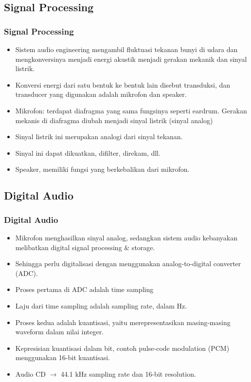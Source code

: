 \documentclass[pdflatex,compress]{beamer}
\begin{document}
\subsection{Signal Processing}

\begin{frame}
	\frametitle{Signal Processing}
	\begin{itemize}
		\item Sistem audio engineering mengambil fluktuasi tekanan bunyi di udara dan mengkonversinya menjadi energi akustik menjadi gerakan mekanik dan sinyal listrik.
		\item Konversi energi dari satu bentuk ke bentuk lain disebut transduksi, dan transducer yang digunakan adalah mikrofon dan speaker.
		\item Mikrofon: terdapat diafragma yang sama fungsinya seperti eardrum. Gerakan mekanis di diafragma diubah menjadi sinyal listrik (sinyal analog)
		\item Sinyal listrik ini merupakan analogi dari sinyal tekanan.
		\item Sinyal ini dapat dikuatkan, difilter, direkam, dll.
		\item Speaker, memiliki fungsi yang berkebalikan dari mikrofon.
	\end{itemize}
\end{frame}

\subsection{Digital Audio}

\begin{frame}
	\frametitle{Digital Audio}
	\begin{itemize}
		\item Mikrofon menghasilkan sinyal analog, sedangkan sistem audio kebanyakan melibatkan digital signal processing \& storage.
		\item Sehingga perlu digitalisasi dengan menggunakan analog-to-digital converter (ADC).
		\item Proses pertama di ADC adalah time sampling
		\item Laju dari time sampling adalah sampling rate, dalam Hz.
		\item Proses kedua adalah kuantisasi, yaitu merepresentasikan masing-masing waveform dalam nilai integer.
		\item Kepresisian kuantisasi dalam bit, contoh pulse-code modulation (PCM) menggunakan 16-bit kuantisasi.
		\item Audio CD $\rightarrow$ 44.1 kHz sampling rate dan 16-bit resolution.
	\end{itemize}
\end{frame}
\end{document}
